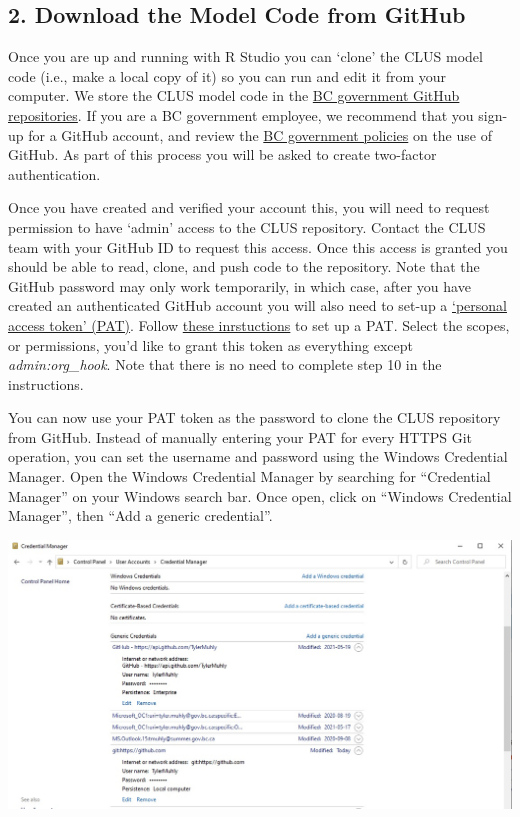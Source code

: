 \documentclass[
]{article}
\begin{document}
\hypertarget{download-the-model-code-from-github}{%
\subsection{2. Download the Model Code from
GitHub}\label{download-the-model-code-from-github}}

Once you are up and running with R Studio you can `clone' the CLUS model
code (i.e., make a local copy of it) so you can run and edit it from
your computer. We store the CLUS model code in the
\href{https://github.com/bcgov}{BC government GitHub repositories}. If
you are a BC government employee, we recommend that you sign-up for a
GitHub account, and review the
\href{https://github.com/bcgov/BC-Policy-Framework-For-GitHub/blob/main/BC-Open-Source-Development-Employee-Guide/README.md}{BC
government policies} on the use of GitHub. As part of this process you
will be asked to create two-factor authentication.

Once you have created and verified your account this, you will need to
request permission to have `admin' access to the CLUS repository.
Contact the CLUS team with your GitHub ID to request this access. Once
this access is granted you should be able to read, clone, and push code
to the repository. Note that the GitHub password may only work
temporarily, in which case, after you have created an authenticated
GitHub account you will also need to set-up a
\href{https://docs.github.com/en/github/authenticating-to-github/keeping-your-account-and-data-secure/creating-a-personal-access-token}{`personal
access token' (PAT)}. Follow
\href{https://docs.github.com/en/github/authenticating-to-github/keeping-your-account-and-data-secure/creating-a-personal-access-token}{these
inrstuctions} to set up a PAT. Select the scopes, or permissions, you'd
like to grant this token as everything except \emph{admin:org\_hook}.
Note that there is no need to complete step 10 in the instructions.

You can now use your PAT token as the password to clone the CLUS
repository from GitHub. Instead of manually entering your PAT for every
HTTPS Git operation, you can set the username and password using the
Windows Credential Manager. Open the Windows Credential Manager by
searching for ``Credential Manager'' on your Windows search bar. Once
open, click on ``Windows Credential Manager'', then ``Add a generic
credential''.

\includegraphics{images/creds.jpg}
\end{document}
